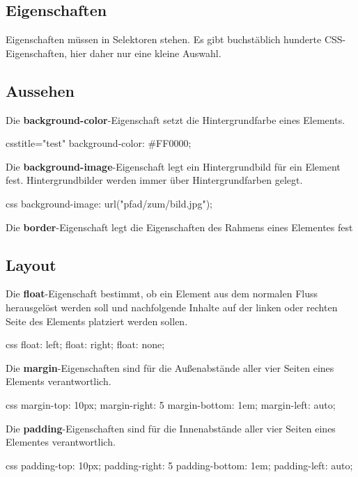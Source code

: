 \documentclass[10pt,a4paper]{article}
\begin{document}
\begin{multicols}{3}
\section*{Eigenschaften}
Eigenschaften müssen in Selektoren stehen. Es gibt buchstäblich hunderte CSS-Eigenschaften\cite{w3c-css}, hier daher nur eine kleine Auswahl.

\subsection*{Aussehen}
Die \textbf{background-color}-Eigenschaft setzt die Hintergrundfarbe eines Elements.
\begin{codebox}{css}{title="test"}
background-color: #FF0000;
\end{codebox}

Die \textbf{background-image}-Eigenschaft legt ein Hintergrundbild für ein Element fest. Hintergrundbilder werden immer über Hintergrundfarben gelegt.
\begin{codebox}{css}{}
background-image: url("pfad/zum/bild.jpg");
\end{codebox}

Die \textbf{border}-Eigenschaft legt die Eigenschaften des Rahmens eines Elementes fest



\subsection*{Layout}
Die \textbf{float}-Eigenschaft bestimmt, ob ein Element aus dem normalen Fluss herausgelöst werden soll und nachfolgende Inhalte auf der linken oder rechten Seite des Elements platziert werden sollen.
\begin{codebox}{css}{}
float: left;
float: right;
float: none;
\end{codebox}

Die \textbf{margin}-Eigenschaften sind für die Außenabstände aller vier Seiten eines Elements verantwortlich.
\begin{codebox}{css}{}
margin-top: 10px;
margin-right: 5%
margin-bottom: 1em;
margin-left: auto;
\end{codebox}

Die \textbf{padding}-Eigenschaften sind für die Innenabstände aller vier Seiten eines Elementes verantwortlich.
\begin{codebox}{css}{}
padding-top: 10px;
padding-right: 5%
padding-bottom: 1em;
padding-left: auto;
\end{codebox}


\end{multicols}
\end{document}
